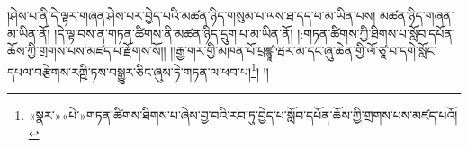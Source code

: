 །ཤེས་པ་ནི་དེ་ལྟར་གཞན་ཤེས་པར་བྱེད་པའི་མཚན་ཉིད་གསུམ་པ་ལས་ཐ་དད་པ་མ་ཡིན་པས། མཚན་ཉིད་གཞན་མ་ཡིན་ནོ། །དེ་ལྟ་བས་ན་གཏན་ཚིགས་ནི་མཚན་ཉིད་དྲུག་པ་མ་ཡིན་ནོ། །:གཏན་ཚིགས་ཀྱི་ཐིགས་པ་སློབ་དཔོན་ཆོས་ཀྱི་གྲགས་པས་མཛད་པ་རྫོགས་སོ།། །།རྒྱ་གར་གྱི་མཁན་པོ་པྲཛྙཱ་ཝར་མ་དང་ཞུ་ཆེན་གྱི་ལོ་ཙཱ་བ་དགེ་སློང་དཔལ་བརྩེགས་རཀྵི་ཏས་བསྒྱུར་ཅིང་ཞུས་ཏེ་གཏན་ལ་ཕབ་པ།\footnote{«སྣར་»«པེ་»གཏན་ཚིགས་ཐིགས་པ་ཞེས་བྱ་བའི་རབ་ཏུ་བྱེད་པ་སློབ་དཔོན་ཆོས་ཀྱི་གྲགས་པས་མཛད་པའོ།}། །།